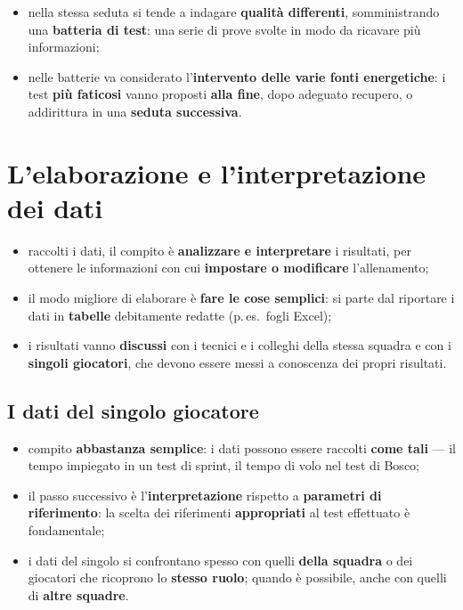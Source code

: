 \begin{itemize}
  \item nella stessa seduta si tende a indagare \textbf{qualità differenti}, somministrando una
    \textbf{batteria di test}: una serie di prove svolte in modo da ricavare più informazioni;
  \item nelle batterie va considerato l'\textbf{intervento delle varie fonti energetiche}: i test
    \textbf{più faticosi} vanno proposti \textbf{alla fine}, dopo adeguato recupero, o addirittura
    in una \textbf{seduta successiva}.
\end{itemize}

\section{L'elaborazione e l'interpretazione dei dati}

\begin{itemize}
  \item raccolti i dati, il compito è \textbf{analizzare e interpretare} i risultati, per ottenere
    le informazioni con cui \textbf{impostare o modificare} l'allenamento;
  \item il modo migliore di elaborare è \textbf{fare le cose semplici}: si parte dal riportare i
    dati in \textbf{tabelle} debitamente redatte (p.\,es.\ fogli Excel);
  \item i risultati vanno \textbf{discussi} con i tecnici e i colleghi della stessa squadra e con i
    \textbf{singoli giocatori}, che devono essere messi a conoscenza dei propri risultati.
\end{itemize}

\subsection{I dati del singolo giocatore}

\begin{itemize}
  \item compito \textbf{abbastanza semplice}: i dati possono essere raccolti \textbf{come tali} ---
    il tempo impiegato in un test di sprint, il tempo di volo nel test di Bosco;
  \item il passo successivo è l'\textbf{interpretazione} rispetto a \textbf{parametri di
    riferimento}: la scelta dei riferimenti \textbf{appropriati} al test effettuato è fondamentale;
  \item i dati del singolo si confrontano spesso con quelli \textbf{della squadra} o dei giocatori
    che ricoprono lo \textbf{stesso ruolo}; quando è possibile, anche con quelli di \textbf{altre
    squadre}.
\end{itemize}

